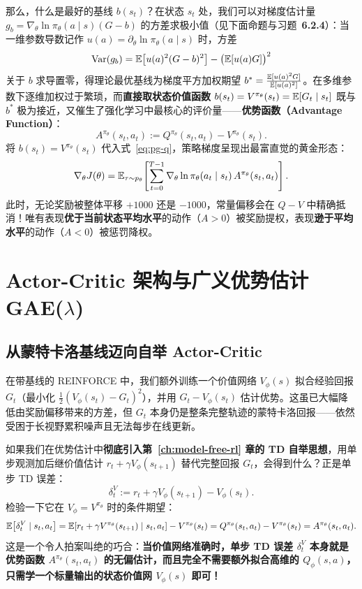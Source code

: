 那么，什么是最好的基线 $b(s_t)$？在状态 $s_t$ 处，我们可以对梯度估计量 $g_b = \nabla_\theta \ln \pi_\theta(a \mid s)(G - b)$ 的方差求极小值（见下面命题与习题~\textbf{6.2.4}）：当一维参数导数记作 $u(a) = \partial_\theta \ln \pi_\theta(a\mid s)$ 时，方差
\[
  \operatorname{Var}(g_b) = \mathbb{E}\!\left[u(a)^2 (G - b)^2\right] - \big(\mathbb{E}[u(a) G]\big)^2
\]
关于 $b$ 求导置零，得理论最优基线为梯度平方加权期望 $b^* = \frac{\mathbb{E}[u(a)^2 G]}{\mathbb{E}[u(a)^2]}$。在多维参数下逐维加权过于繁琐，而\textbf{直接取状态价值函数 $b(s_t) = V^{\pi_\theta}(s_t) = \mathbb{E}[G_t \mid s_t]$} 既与 $b^*$ 极为接近，又催生了强化学习中最核心的评价量——\textbf{优势函数（Advantage Function）}：
\begin{equation}
  A^{\pi_\theta}(s_t, a_t) := Q^{\pi_\theta}(s_t, a_t) - V^{\pi_\theta}(s_t).
  \label{eq:advantage-def}
\end{equation}
将 $b(s_t) = V^{\pi_\theta}(s_t)$ 代入式~\eqref{eq:pg-q}，策略梯度呈现出最富直觉的黄金形态：
\[
  \nabla_\theta J(\theta) = \mathbb{E}_{\tau \sim p_\theta}\!\left[\sum_{t=0}^{T-1} \nabla_\theta \ln \pi_\theta(a_t \mid s_t)\, A^{\pi_\theta}(s_t, a_t)\right].
\]
此时，无论奖励被整体平移 $+1000$ 还是 $-1000$，常量偏移会在 $Q - V$ 中精确抵消！唯有表现\textbf{优于当前状态平均水平}的动作（$A > 0$）被奖励提权，表现\textbf{逊于平均水平}的动作（$A < 0$）被惩罚降权。

\section{Actor-Critic 架构与广义优势估计 GAE($\lambda$)}
\label{sec:actor-critic-gae}

\subsection{从蒙特卡洛基线迈向自举 Actor-Critic}

在带基线的 REINFORCE 中，我们额外训练一个价值网络 $V_\phi(s)$ 拟合经验回报 $G_t$（最小化 $\frac{1}{2}(V_\phi(s_t) - G_t)^2$），并用 $G_t - V_\phi(s_t)$ 估计优势。这虽已大幅降低由奖励偏移带来的方差，但 $G_t$ 本身仍是整条完整轨迹的蒙特卡洛回报——依然受困于长视野累积噪声且无法每步在线更新。

如果我们在优势估计中\textbf{彻底引入第~\ref{ch:model-free-rl} 章的 TD 自举思想}，用单步观测加后继价值估计 $r_t + \gamma V_\phi(s_{t+1})$ 替代完整回报 $G_t$，会得到什么？正是单步 TD 误差：
\begin{equation}
  \delta_t^V := r_t + \gamma V_\phi(s_{t+1}) - V_\phi(s_t).
  \label{eq:ac-td-error}
\end{equation}
检验一下它在 $V_\phi = V^{\pi_\theta}$ 时的条件期望：
\[
  \mathbb{E}\!\left[\delta_t^V \mid s_t, a_t\right]
  = \mathbb{E}\!\left[r_t + \gamma V^{\pi_\theta}(s_{t+1}) \mid s_t, a_t\right] - V^{\pi_\theta}(s_t)
  = Q^{\pi_\theta}(s_t, a_t) - V^{\pi_\theta}(s_t) = A^{\pi_\theta}(s_t, a_t).
\]
这是一个令人拍案叫绝的巧合：\textbf{当价值网络准确时，单步 TD 误差 $\delta_t^V$ 本身就是优势函数 $A^{\pi_\theta}(s_t, a_t)$ 的无偏估计，而且完全不需要额外拟合高维的 $Q_\phi(s, a)$，只需学一个标量输出的状态价值网 $V_\phi(s)$ 即可！}

